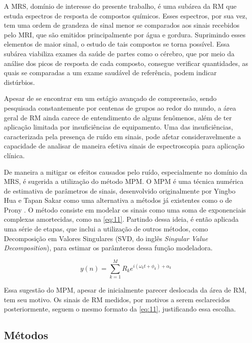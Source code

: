 \documentclass[
12pt,		
twoside, 
a4paper,
chapter=TITLE,
english,			
brazil]{USPSC-classe/USPSC}
\begin{document}
A MRS, domínio de interesse do presente trabalho, é uma subárea da RM que estuda espectros de resposta de compostos químicos. 
Esses espectros, por sua vez, tem uma ordem de grandeza de sinal menor se comparados aos sinais recebidos pelo MRI, que são emitidos 
principalmente por água e gordura. Suprimindo esses elementos de maior sinal, o estudo de tais compostos se torna possível. 
Essa subárea viabiliza exames da saúde de partes como o cérebro, que por meio da análise dos picos de resposta de cada composto, 
consegue verificar quantidades, as quais se comparadas a um exame saudável de referência, podem indicar distúrbios.

Apesar de se encontrar em um estágio avançado de compreensão, sendo pesquisada constantemente por centenas de grupos ao redor do mundo, a 
área geral de RM ainda carece de entendimento de alguns fenômenos, além de ter aplicação limitada por insuficiências de equipamento. 
Uma das insuficiências, caracterizada pela presença de ruído em sinais, pode afetar consideravelmente a capacidade de 
analisar de maneira efetiva sinais de espectroscopia para aplicação clínica. 

De maneira a mitigar os efeitos causados pelo ruído, especialmente no domínio da MRS, é sugerida a utilização do método MPM. O MPM é uma técnica numérica
de estimativa de parâmetros de sinais, desenvolvido originalmente por Yingbo Hua e Tapan Sakar \cite{370583} como uma alternativa a métodos já existentes 
como o de Prony \cite{49090}. O método consiste em modelar os sinais como uma soma de exponenciais complexas amortecidas, como na \autoref{eq:11}. Partindo 
dessa ideia, é então aplicada uma série de etapas, que inclui a utilização de outros métodos, como Decomposição em Valores Singulares (SVD, do inglês \textit{Singular Value Decomposition}), 
para estimar os parâmteros dessa função modeladora.  


\begin{equation} \label{eq:11}
    y(n) = \sum_{k=1}^{M} R_k e^{i (\omega_k t + \phi_k) + \alpha_k }
\end{equation}

Essa sugestão do MPM, apesar de inicialmente parecer deslocada da área de RM, tem seu motivo. Os sinais de RM medidos, por motivos a serem esclarecidos posteriormente, seguem o mesmo
formato da \autoref{eq:11}, justificando essa escolha.

\subsection{Métodos}
\end{document}
